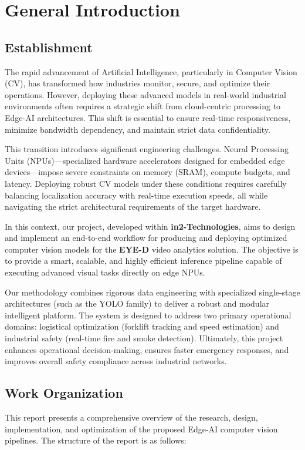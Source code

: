 \chapter*{General Introduction}

\section*{Establishment}
The rapid advancement of Artificial Intelligence, particularly in Computer Vision (CV), has transformed how industries monitor, secure, and optimize their operations. However, deploying these advanced models in real-world industrial environments often requires a strategic shift from cloud-centric processing to Edge-AI architectures. This shift is essential to ensure real-time responsiveness, minimize bandwidth dependency, and maintain strict data confidentiality.

This transition introduces significant engineering challenges. Neural Processing Units (NPUs)—specialized hardware accelerators designed for embedded edge devices—impose severe constraints on memory (SRAM), compute budgets, and latency. Deploying robust CV models under these conditions requires carefully balancing localization accuracy with real-time execution speeds, all while navigating the strict architectural requirements of the target hardware.

In this context, our project, developed within \textbf{in2-Technologies}, aims to design and implement an end-to-end workflow for producing and deploying optimized computer vision models for the \textbf{EYE-D} video analytics solution. The objective is to provide a smart, scalable, and highly efficient inference pipeline capable of executing advanced visual tasks directly on edge NPUs.

Our methodology combines rigorous data engineering with specialized single-stage architectures (such as the YOLO family) to deliver a robust and modular intelligent platform. The system is designed to address two primary operational domains: logistical optimization (forklift tracking and speed estimation) and industrial safety (real-time fire and smoke detection). Ultimately, this project enhances operational decision-making, ensures faster emergency responses, and improves overall safety compliance across industrial networks.

\section*{Work Organization}
This report presents a comprehensive overview of the research, design, implementation, and optimization of the proposed Edge-AI computer vision pipelines. The structure of the report is as follows:

